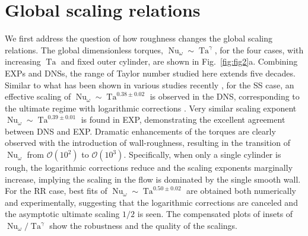 \documentclass[aps,prl,superscriptaddress,preprint]{revtex4}
\newcommand{\Ta}{\operatorname{Ta}}
\newcommand{\Nu}{\operatorname{Nu}_{\omega}}
\begin{document}

 
 










\section{Global scaling relations} 

We first address the question of how roughness changes the global scaling relations. The global dimensionless torques, $\Nu \sim \Ta^{\gamma}$, for the four cases, with increasing $\Ta$ and fixed outer cylinder, are shown in Fig.\ \ref{fig:fig2}a. Combining EXPs and DNSs, the range of Taylor number studied here extends five decades. Similar to what has been shown in various studies recently \cite{he12,gil11,ost14pof,ost14pd,lat92,bra13}, for the SS case, an effective scaling of  $\Nu \sim \Ta^{0.38\pm0.02}$ is observed in the DNS, corresponding to the ultimate regime with logarithmic corrections \cite{kra62,gro11}. Very similar scaling exponent $\Nu \sim \Ta^{0.39 \pm 0.01}$ is found in EXP, demonstrating the excellent agreement between DNS and EXP. Dramatic enhancements of the torques are clearly observed with the introduction of wall-roughness, resulting in the transition of $\Nu$ from $\mathcal{O}(10^2)$ to $\mathcal{O}(10^3)$. Specifically, when only a single cylinder is rough, the logarithmic corrections reduce and the scaling exponents marginally increase, implying the scaling in the 
flow is dominated by the single smooth wall. For the RR case, best fits of $\Nu \sim \Ta^{0.50\pm0.02}$ are obtained both numerically and experimentally, suggesting that the logarithmic corrections are canceled and the asymptotic ultimate scaling $1/2$ is seen. The compensated plots of insets of $\Nu/\Ta^{\gamma}$ show the robustness and the quality of the scalings. 
\end{document}
